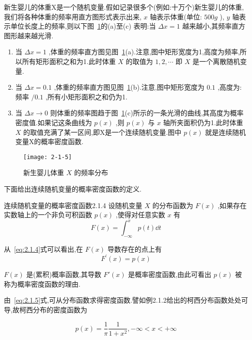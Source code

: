 \begin{example}\label{exam:2.1.6}
	新生婴儿的体重X是一个随机变量.假如记录很多个(例如:十万个)新生婴儿的体重,我们将各种体重的频率用直方图形式表示出来, $ x $ 轴表示体重(单位: $ 500g $ ), $ y $ 轴表示单位长度上的频率,则以下图~\ref{fig:2.1.5}的(a)至(c)
	表明:当 $ \Delta x=1 $ 越来越小,其频率直方图形越来越光滑.
	
	\begin{enumerate}
		\item 当 $ \Delta x=1 $ ,体重的频率直方图见图~\ref{fig:2.1.5}(a).注意,图中矩形宽度为1,高度为频率,所以所有矩形面积之和为1.此时体重 $ X $ 的取值为 $ 1,2, \cdots $ 即 $ X $ 是一个离散随机变量.
		\item 当 $ \Delta x=0.1 $ ,体重的频率直方图见图~\ref{fig:2.1.5}(b).注意,图中矩形宽度为
		 $ 0.1 $ ,高度为:频率 $ /0.1 $ ,所有小矩形面积之和仍为1.
		\item 当 $ \Delta x \rightarrow 0 $ 则体重的频率图趋于图~\ref{fig:2.1.5}(c)所示的一条光滑的曲线,其高度为概率密度值.如果记这条曲线为 $ p(x) $ ,则 $ p(x) $ 与 $ x $ 轴所夹面积仍为1.此时体重 $ X $ 的取值充满了某一区间,即X是一个连续随机变量.图中 $ p(x) $ 就是连续随机变量X的概率密度函数.
	\end{enumerate}
	
\end{example}

\begin{figure}
	\centering
	\texttt{[image: 2-1-5]}
	\caption{新生婴儿体重 $ X $ 的频率分布}
	\label{fig:2.1.5}
\end{figure}

下面给出连续随机变量的概率密度函数的定义.

\begin{definition}{连续随机变量的概率密度函数}{2.1.4}
	设随机变量 $ X $ 的分布函数为 $ F(x) $ ,如果存在实数轴上的一个非负可积函数 $ p(x) $ ,使得对任意实数 $ x $ 有
	\begin{equation} 
	F(x)=\int_{-\infty}^{x} p(t) \dd t \label{eq:2.1.4}
	\end{equation}
	
	从~\ref{eq:2.1.4}式可以看出,在 $ F(x) $ 导数存在的点上有
	\begin{equation} 
	F^{\prime}(x)=p(x) \label{eq:2.1.5}
	\end{equation}
	
	 $ F(x) $ 是(累积)概率函数,其导数 $ F'(x) $ 是概率密度函数,由此可看出 $ p(x) $ 被称为概率密度函数的理由.
	
	由~\ref{eq:2.1.5}式,可从分布函数求得密度函数.譬如例2.1.2给出的柯西分布函数处处可导,故柯西分布的密度函数为
	
	\[ 
	p(x)=\frac{1}{\pi} \frac{1}{1+x^{2}},-\infty<x<+\infty
	\]
\end{definition}

